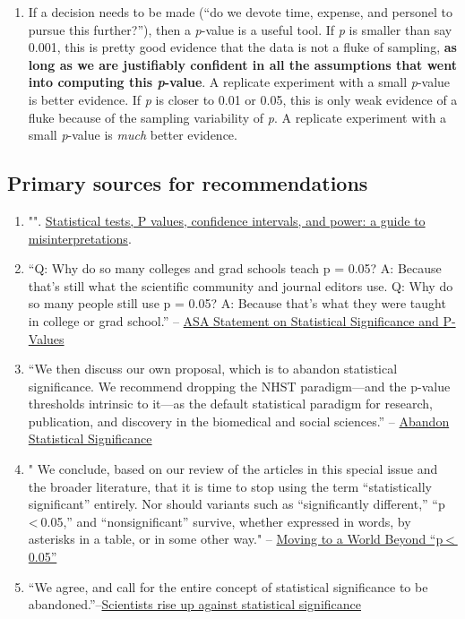 \documentclass[]{book}
\providecommand{\tightlist}{%
  \setlength{\itemsep}{0pt}\setlength{\parskip}{0pt}}
\begin{document}
\begin{enumerate}
\def\labelenumi{\arabic{enumi}.}
\setcounter{enumi}{2}
\tightlist
\item
  If a decision needs to be made (``do we devote time, expense, and personel to pursue this further?''), then a \emph{p}-value is a useful tool. If \emph{p} is smaller than say 0.001, this is pretty good evidence that the data is not a fluke of sampling, \textbf{as long as we are justifiably confident in all the assumptions that went into computing this \emph{p}-value}. A replicate experiment with a small \emph{p}-value is better evidence. If \emph{p} is closer to 0.01 or 0.05, this is only weak evidence of a fluke because of the sampling variability of \emph{p}. A replicate experiment with a small \emph{p}-value is \emph{much} better evidence.
\end{enumerate}

\hypertarget{primary-sources-for-recommendations}{%
\subsection{Primary sources for recommendations}\label{primary-sources-for-recommendations}}

\begin{enumerate}
\def\labelenumi{\arabic{enumi}.}
\tightlist
\item
  "". \href{https://link.springer.com/article/10.1007/s10654-016-0149-3}{Statistical tests, P values, confidence intervals, and power: a guide to misinterpretations}.
\item
  ``Q: Why do so many colleges and grad schools teach p = 0.05? A: Because that's still what the scientific community and journal editors use. Q: Why do so many people still use p = 0.05? A: Because that's what they were taught in college or grad school.'' -- \href{https://amstat.tandfonline.com/doi/full/10.1080/00031305.2016.1154108}{ASA Statement on Statistical Significance and P-Values}
\item
  ``We then discuss our own proposal, which is to abandon statistical significance. We recommend dropping the NHST paradigm---and the p-value thresholds intrinsic to it---as the default statistical paradigm for research, publication, and discovery in the biomedical and social sciences.'' -- \href{https://www.tandfonline.com/doi/abs/10.1080/00031305.2018.1527253}{Abandon Statistical Significance}
\item
  " We conclude, based on our review of the articles in this special issue and the broader literature, that it is time to stop using the term ``statistically significant'' entirely. Nor should variants such as ``significantly different,'' ``p \textless{} 0.05,'' and ``nonsignificant'' survive, whether expressed in words, by asterisks in a table, or in some other way." -- \href{https://www.tandfonline.com/doi/full/10.1080/00031305.2019.1583913}{Moving to a World Beyond ``p \textless{} 0.05''}
\item
  ``We agree, and call for the entire concept of statistical significance to be abandoned.''--\href{https://www.nature.com/articles/d41586-019-00857-9}{Scientists rise up against statistical significance}
\end{enumerate}
\end{document}
